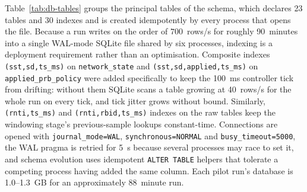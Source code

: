 Table~\ref{tab:db-tables} groups the principal tables of the schema, which declares 23 tables and 30 indexes and is created idempotently by every process that opens the file. Because a run writes on the order of $700$~rows/s for roughly 90~minutes into a single WAL-mode SQLite file shared by six processes, indexing is a deployment requirement rather than an optimisation. Composite indexes \texttt{(sst,sd,ts\_ms)} on \texttt{network\_state} and \texttt{(sst,sd,applied,ts\_ms)} on \texttt{applied\_prb\_policy} were added specifically to keep the 100~ms controller tick from drifting: without them SQLite scans a table growing at 40~rows/s for the whole run on every tick, and tick jitter grows without bound. Similarly, \texttt{(rnti,ts\_ms)} and \texttt{(rnti,rbid,ts\_ms)} indexes on the raw tables keep the windowing stage's previous-sample lookups constant-time. Connections are opened with \texttt{journal\_mode=WAL}, \texttt{synchronous=NORMAL} and \texttt{busy\_timeout=5000}, the WAL pragma is retried for 5~s because several processes may race to set it, and schema evolution uses idempotent \texttt{ALTER TABLE} helpers that tolerate a competing process having added the same column. Each pilot run's database is 1.0--1.3~GB for an approximately 88~minute run.

